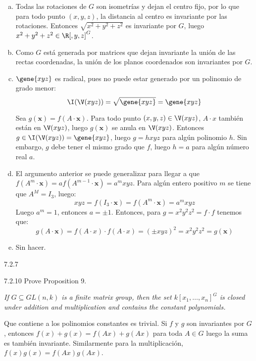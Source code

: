 \documentclass[twoside]{article}
\begin{document}
\begin{solucion}
\begin{enumerate}[a.]
\item Todas las rotaciones de $G$ son isometrías y dejan el centro fijo, por lo que para todo punto $(x,y,z)$, la distancia al centro es invariante por las rotaciones.
Entonces $\sqrt{x^2+y^2+z^2}$ es invariante por $G$, luego $x^2+y^2+z^2 \in \R[,y,z]^G$.

\item Como $G$ está generada por matrices que dejan invariante la unión de las rectas coordenadas, la unión de los planos coordenados son invariantes por $G$.

\item $\gene{xyz}$ es radical, pues no puede estar generado por un polinomio de grado menor:
\[ \I(\V(xyz)) = \sqrt{\gene{xyz}} = \gene{xyz} \]

Sea $g(\mathbf{x}) = f(A \cdot \mathbf{x})$.
Para todo punto $(x,y,z) \in \V(xyz)$, $A \cdot x$ también están en $\V(xyz)$, luego $g(\mathbf{x})$ se anula en $\V(xyz)$.
Entonces $g \in \I(\V(xyz)) = \gene{xyz}$, luego $g = hxyz$ para algún polinomio $h$.
Sin embargo, $g$ debe tener el mismo grado que $f$, luego $h=a$ para algún número real $a$.

\item El argumento anterior se puede generalizar para llegar a que $f(A^m \cdot \mathbf{x}) = a f(A^{m-1}\cdot \mathbf{x}) = a^m xyz$.
Para algún entero positivo $m$ se tiene que $A^M = I_3$, luego:
\[ xyz = f(I_3 \cdot \mathbf{x}) = f(A^m \cdot \mathbf{x}) = a^m xyz \]
Luego $a^m = 1$, entonces $a = \pm 1$.
Entonces, para $g = x^2y^2z^2 = f\cdot f$ tenemos que:
\[ g(A \cdot \mathbf{x}) = f(A \cdot x)\cdot f(A \cdot x) = (\pm xyz)^2 = x^2y^2z^2 = g(\mathbf{x})\]

\item Sin hacer.
\end{enumerate}

\end{solucion}
\newpage

\begin{ejercicio}{7.2.7}

\end{ejercicio}
\begin{solucion}

\end{solucion}
\newpage

\begin{ejercicio}{7.2.10}
Prove Proposition 9.
\end{ejercicio}
\begin{solucion}
\emph{If $G ⊆ GL(n, k)$ is a finite matrix group, then the set $k[x_1, \dots , x_n]^G$
is closed under addition and multiplication and contains the constant polynomials.}


Que contiene a los polinomios constantes es trivial. Si $f$ y $g$ son invariantes por $G$, entonces $f(x)+g(x)=f(Ax)+g(Ax)$ para toda $A\in G$ luego la suma es también invariante. Similarmente para la multiplicación, $f(x)g(x)=f(Ax)g(Ax)$. 
\end{solucion}
\end{document}
